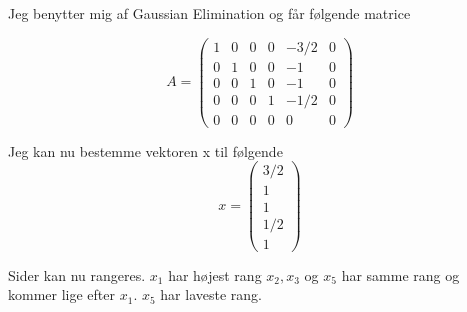 \documentclass[12pt]{article}
\begin{document}
\begin{enumerate}[{a}]
Jeg benytter mig af Gaussian Elimination og får følgende matrice

$$A = \left(\begin{array}{ccccc|c}
1&0&0&0&-3/2&0
\\
0&1&0&0&-1&0
\\
0&0&1&0&-1&0
\\
0&0&0&1&-1/2&0\\
0&0&0&0&0&0
\end{array}\right)$$

Jeg kan nu bestemme vektoren x til følgende
$$x = \left(\begin{array}{c}
3/2\\1\\1\\1/2\\1
\end{array}\right)$$

Sider kan nu rangeres. $x_1$ har højest rang $x_2, x_3 $ og $ x_5$ har samme
rang og kommer lige efter $x_1$. $x_5$ har laveste rang.

\end{enumerate}
\end{document}
